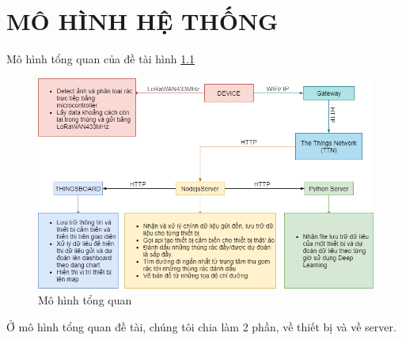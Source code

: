 
\chapter{MÔ HÌNH HỆ THỐNG}

Mô hình tổng quan của đề tài hình \ref{fig:general_chart}
\begin{figure}[H]
    \centering
    \includegraphics[width=\textwidth]{images/general_chart.png}
    \caption{Mô hình tổng quan}
    \label{fig:general_chart}
\end{figure}
Ở mô hình tổng quan đề tài, chúng tôi chia làm 2 phần, về thiết bị và về server.

